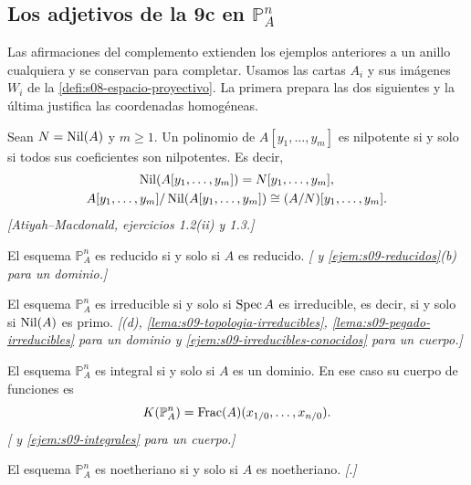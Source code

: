 \subsection{Los adjetivos de la 9c en \texorpdfstring{$\mathbb P^n_A$}{PnA}}

Las afirmaciones del complemento extienden los ejemplos anteriores a un anillo cualquiera y se conservan para completar. Usamos las cartas $A_i$ y sus imágenes $W_i$ de la \cref{defi:s08-espacio-proyectivo}. La primera prepara las dos siguientes y la última justifica las coordenadas homogéneas.

\begin{afirm}
\label{afirm:s09-nilradical-polinomios}
Sean $N=\operatorname{Nil}(A)$ y $m\ge1$. Un polinomio de $A[y_1,\ldots,y_m]$ es nilpotente si y solo si todos sus coeficientes son nilpotentes. Es decir,
\[
\begin{gathered}
\operatorname{Nil}(A[y_1,\ldots,y_m])=N[y_1,\ldots,y_m],
\\
A[y_1,\ldots,y_m]/\operatorname{Nil}(A[y_1,\ldots,y_m])
\cong(A/N)[y_1,\ldots,y_m].
\end{gathered}
\]
\emph{[Atiyah--Macdonald, ejercicios 1.2(ii) y 1.3.]}
\end{afirm}

\begin{afirm}
\label{afirm:s09-proyectivo-reducido}
El esquema $\mathbb P^n_A$ es reducido si y solo si $A$ es reducido. \emph{[ y \cref{ejem:s09-reducidos}(b) para un dominio.]}
\end{afirm}

\begin{afirm}
\label{afirm:s09-proyectivo-irreducible}
El esquema $\mathbb P^n_A$ es irreducible si y solo si $\operatorname{Spec} A$ es irreducible, es decir, si y solo si $\operatorname{Nil}(A)$ es primo. \emph{[(d), \cref{lema:s09-topologia-irreducibles}, \cref{lema:s09-pegado-irreducibles} para un dominio y \cref{ejem:s09-irreducibles-conocidos} para un cuerpo.]}
\end{afirm}

\begin{afirm}
\label{afirm:s09-proyectivo-integral}
El esquema $\mathbb P^n_A$ es integral si y solo si $A$ es un dominio. En ese caso su cuerpo de funciones es
\[
K(\mathbb P^n_A)=\operatorname{Frac}(A)(x_{1/0},\ldots,x_{n/0}).
\]
\emph{[ y \cref{ejem:s09-integrales} para un cuerpo.]}
\end{afirm}

\begin{afirm}
\label{afirm:s09-proyectivo-noetheriano}
El esquema $\mathbb P^n_A$ es noetheriano si y solo si $A$ es noetheriano. \emph{[.]}
\end{afirm}


